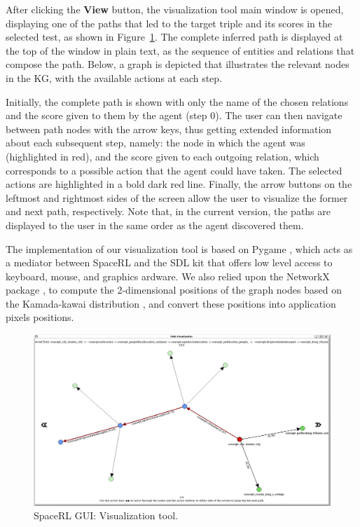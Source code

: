 After clicking the \textbf{View} button,  the visualization tool main window is opened, displaying one of the paths that led to the target triple and its scores in the selected test, as shown in Figure~\ref{fig:visualizer}. The complete inferred path is displayed at the top of the window in plain text, as the sequence of entities and relations that compose the path. Below, a graph is depicted that illustrates the relevant nodes in the KG, with the available actions at each step. 

Initially, the complete path is shown with only the name of the chosen relations and the score given to them by the agent (step 0). The user can then navigate between path nodes with the arrow keys, thus getting extended information about each subsequent step, namely: the node in which the agent was (highlighted in red), and the score given to each outgoing relation, which corresponds to a possible action that the agent could have taken. The selected actions are highlighted in a bold dark red line. Finally, the arrow buttons on the leftmost and rightmost sides of the screen allow the user to visualize the former and next path, respectively. Note that, in the current version, the paths are displayed to the user in the same order as the agent discovered them.

The implementation of our visualization tool is based on Pygame \cite{PyGame}, which acts as a mediator between SpaceRL and the SDL kit \cite{SDLKit} that offers low level access to keyboard, mouse, and graphics ardware. We also relied upon the NetworkX package \cite{NetworkX}, to compute the 2-dimensional positions of the graph nodes based on the Kamada-kawai distribution \cite{kamada1989algorithm}, and convert these positions into application pixels positions.

\begin{landscape}
    \begin{figure}[!h]
        \centering
        \includegraphics[width=1.65\textwidth]{fig/framework/GUI/Visualizer_2}
        \caption{SpaceRL GUI: Visualization tool.}
        \label{fig:visualizer}
    \end{figure}
\end{landscape}

